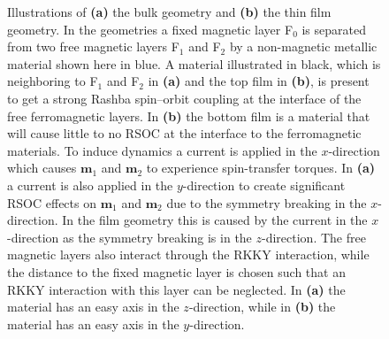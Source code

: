 \begin{figure}[h!]
\begin{subfigure}{.6\textwidth}
\caption{}
\label{fig:FGeometry} 
\end{subfigure}
\caption{Illustrations of \textbf{(a)} the bulk geometry and \textbf{(b)} the thin film geometry. In the geometries a fixed magnetic layer F$_0$ is separated from two free magnetic layers F$_1$ and F$_2$ by a non-magnetic metallic material shown here in blue. A material illustrated in black, which is neighboring to F$_1$ and F$_2$ in \textbf{(a)} and the top film in \textbf{(b)}, is present to get a strong Rashba spin--orbit coupling at the interface of the free ferromagnetic layers. In \textbf{(b)} the bottom film is a material that will cause little to no RSOC at the interface to the ferromagnetic materials. To induce dynamics a current is applied in the $x$-direction which causes $\mathbold{m}_1$ and $\mathbold{m}_2$ to experience spin-transfer torques. In \textbf{(a)} a current is also applied in the $y$-direction to create significant RSOC effects on $\mathbold{m}_1$ and $\mathbold{m}_2$ due to the symmetry breaking in the $x$-direction. In the film geometry this is caused by the current in the $x$-direction as the symmetry breaking is in the $z$-direction. The free magnetic layers also interact through the RKKY interaction, while the distance to the fixed magnetic layer is chosen such that an RKKY interaction with this layer can be neglected. In \textbf{(a)} the material has an easy axis in the $z$-direction, while in \textbf{(b)} the material has an easy axis in the $y$-direction.}
\label{fig:Geometries}
\end{figure}

